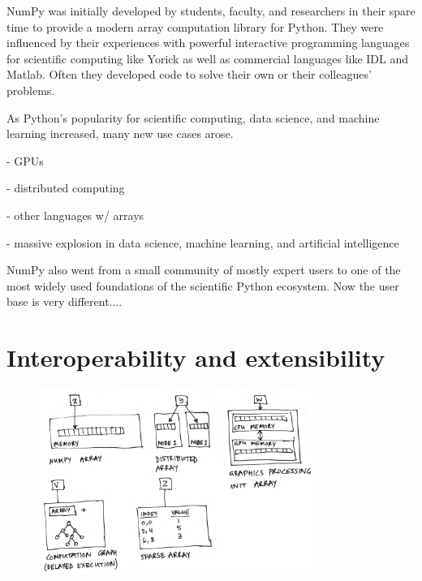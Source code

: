 NumPy was initially developed by students, faculty, and researchers in their
spare time to provide a modern array computation library for Python.
They were influenced by their experiences with powerful interactive programming
languages for scientific computing like Yorick \cite{munro1995using} as well
as commercial languages like IDL and Matlab.
Often they developed code to solve their own or their colleagues' problems.

As Python's popularity for scientific computing, data science, and machine
learning increased, many new use cases arose.

- GPUs

- distributed computing

- other languages w/ arrays

- massive explosion in data science, machine learning, and artificial intelligence

NumPy also went from a small community of mostly expert users to
one of the most widely used foundations of the scientific Python
ecosystem.
Now the user base is very different....

\section*{Interoperability and extensibility}

\begin{figure}
  \centering
  \includegraphics[width=0.8\textwidth]{static/sketches/duck-arrays}
  \caption{}
  \label{fig:duck-arrays}
\end{figure}


